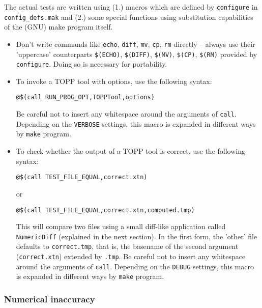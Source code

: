 \documentclass[a4]{article}
\begin{document}
The actual tests are written using (1.) macros which are defined by
\texttt{configure} in \texttt{config\_defs.mak} and (2.) some special
functions using substitution capabilities of the (GNU) make program itself.
\begin{itemize}
 \item Don't write commands like \texttt{echo}, \texttt{diff}, \texttt{mv},
  \texttt{cp}, \texttt{rm} directly -- always use their 'uppercase'
  counterparts \texttt{\$(ECHO)}, \texttt{\$(DIFF)}, \texttt{\$(MV)},
  \texttt{\$(CP)}, \texttt{\$(RM)} provided by \texttt{configure}.  Doing so is
  necessary for portability.

 \item To invoke a TOPP tool with options, use the following syntax:

  \texttt{@\$(call RUN\_PROG\_OPT,TOPPTool,options)}

  Be careful not to insert any whitespace around the arguments of
  \texttt{call}.  Depending on the \texttt{VERBOSE} settings, this macro is
  expanded in different ways by \texttt{make} program.

 \item To check whether the output of a TOPP tool is correct, use the following syntax:

  \texttt{@\$(call TEST\_FILE\_EQUAL,correct.xtn)}
  
  or 

  \texttt{@\$(call TEST\_FILE\_EQUAL,correct.xtn,computed.tmp)}
  
  This will compare two files using a small diff-like application called
  \texttt{NumericDiff} (explained in the next section).  In the first form,
  the 'other' file defaults to \texttt{correct.tmp}, that is, the basename of
  the second argument (\texttt{correct.xtn}) extended by \texttt{.tmp}.  Be
  careful not to insert any whitespace around the arguments of \texttt{call}.
  Depending on the \texttt{DEBUG} settings, this macro is expanded in
  different ways by \texttt{make} program.
  
\end{itemize}

\subsubsection{Numerical inaccuracy}
\end{document}
